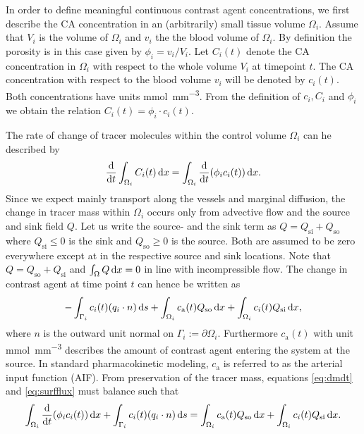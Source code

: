 \documentclass[paper=a4, fontsize=11pt,parskip=half,headings=small]{scrartcl}
\newcommand{\Qso}{Q_{\mathrm{so}}}
\newcommand{\Qsi}{Q_{\mathrm{si}}}
\newcommand{\ca}{c_\mathrm{a}}
\newcommand{\sic}{\milli\mol\per\cubic\milli\meter}
\begin{document}
	In order to define meaningful continuous contrast agent concentrations, we first describe the CA concentration in an (arbitrarily) small tissue volume $\Omega_i$.
	Assume that $V_i$ is the volume of $\Omega_i$ and $v_i$ the the blood volume of $\Omega_i$.
	By definition the porosity is in this case given by $\phi_i = v_i/V_i$.
	Let $C_i(t)$ denote the CA concentration in $\Omega_i$ with respect to the whole volume $V_i$ at timepoint $t$.
	The CA concentration with respect to the blood volume $v_i$ will be denoted by $c_i(t)$.
	Both concentrations have units \si{\sic}. 
	From the definition of $c_i,C_i$ and $\phi_i$ we obtain the relation $C_i(t) = \phi_i \cdot c_i(t)$.

	The rate of change of tracer molecules within the control volume $\Omega_i$ can he described by
	\begin{equation}
		\frac{\mathrm{d}}{\mathrm{d} t}\int_{\Omega_i}C_i(t) \,\mathrm{d} x = \int_{\Omega_i}\frac{\mathrm{d}}{\mathrm{d} t}(\phi_i c_i(t)) \,\mathrm{d} x.
		\label{eq:dmdt}
	\end{equation}	
	Since we expect mainly transport along the vessels and marginal diffusion, the change in tracer mass within $\Omega_i$ occurs only from advective flow and the source and sink field $Q$.
	Let us write the source- and the sink term as $Q = \Qsi + \Qso$ where $\Qsi \le 0$ is the sink and $\Qso \ge 0$ is the source. 
	Both are assumed to be zero everywhere except at in the respective source and sink locations.
	Note that $Q = \Qso + \Qsi$ and $\int_\Omega Q \,\mathrm{d} x = 0$ in line with incompressible flow. 
	The change in contrast agent at time point $t$ can hence be written as
	\begin{equation}
		-\int_{ \Gamma_i}c_i(t)(q_i \cdot n)\diffint s + \int_{\Omega_i}\ca(t) \Qso \diffint x + \int_{\Omega_i}c_i(t)\Qsi \diffint x,
		\label{eq:surfflux}
	\end{equation}
	where $n$ is the outward unit normal on $\Gamma_i := \partial \Omega_i$.
	Furthermore $\ca(t)$ with unit \si{\sic} describes the amount of contrast agent entering the system at the source. 
	In standard pharmacokinetic modeling, $\ca$ is referred to as the arterial input function (AIF).
	From preservation of the tracer mass, equations \eqref{eq:dmdt} and \eqref{eq:surfflux} must balance such that
	\begin{equation}
		\int_{\Omega_i}\diffop{t} (\phi_i c_i(t)) \diffint x + \int_{ \Gamma_i}c_i(t)(q_i \cdot n) \diffint s = \int_{\Omega_i}\ca(t)\Qso \diffint x + \int_{\Omega_i}c_i(t) \Qsi \diffint x.
		\label{eq:conteq}
	\end{equation}
\end{document}
